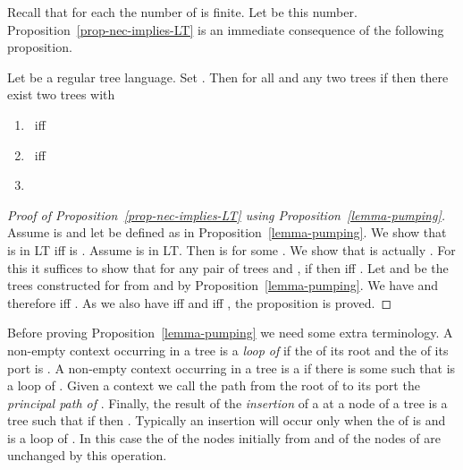 Recall that for each  the number of \ktypes is finite. Let  be this
number. Proposition~\ref{prop-nec-implies-LT} is an immediate consequence of
the following proposition.

\begin{prop}\label{lemma-pumping}
  Let  be a \ktame regular tree language. Set .
  Then for all  and any two trees  if
   then there exist two trees  with
\begin{enumerate}[\em(1)]
\item  ~iff~ 
\item  ~iff~ 
\item {}
\end{enumerate}
\end{prop}

\begin{proof}[Proof of Proposition~\ref{prop-nec-implies-LT} using
  Proposition~\ref{lemma-pumping}]
  Assume  is \ktame and let  be defined as in
  Proposition~\ref{lemma-pumping}. We show that  is in LT iff  is
  \testable{\kappa}. Assume  is in LT. Then  is  for some . We show that  is actually \testable{\kappa}. For this it
  suffices to show that for any pair of trees  and , if
   then  iff . Let  and  be
  the trees constructed for  from  and  by
  Proposition~\ref{lemma-pumping}. We have  and therefore
   iff . As we also have  iff  and  iff , the proposition is proved.
\end{proof}

Before proving Proposition~\ref{lemma-pumping} we need some extra terminology.
A non-empty context  occurring in a tree  is a \emph{loop of \ktype
  } if the \ktype of its root and the \ktype of its port is . A
non-empty context  occurring in a tree  is a \kloop if there is some
\ktype  such that  is a loop of \ktype . Given a context  we call the
path from the root of  to its port the \emph{principal path of
  }. Finally, the result of the \emph{insertion} of a \kloop  at a node
 of a tree  is a tree  such that if  then
. Typically an insertion will occur only when
the \ktype of  is  and  is a loop of \ktype . In this case
the \ktypes of the nodes initially from  and of the nodes of  are unchanged by this operation.


